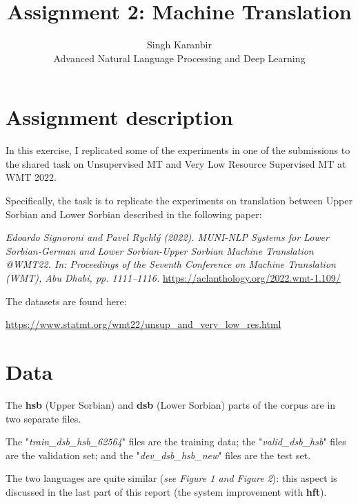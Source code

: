 \documentclass[12pt]{article}
\begin{document}
 
 
\title{Assignment 2: Machine Translation}
\author{Singh Karanbir\\ %
Advanced Natural Language Processing and Deep Learning}

\maketitle

\section{Assignment description}
In this exercise, I replicated some of the experiments in one of the submissions to the shared task on Unsupervised MT and Very Low Resource Supervised MT at WMT 2022.

Specifically, the task is to replicate the experiments on translation between Upper Sorbian and Lower Sorbian described in the following paper:

\vspace{0.5cm}
\textit{Edoardo Signoroni and Pavel Rychlý (2022). MUNI-NLP Systems for Lower Sorbian-German and Lower Sorbian-Upper Sorbian Machine Translation @WMT22. In: Proceedings of the Seventh Conference on Machine Translation (WMT), Abu Dhabi, pp. 1111–1116.}
\href{https://aclanthology.org/2022.wmt-1.109/}{https://aclanthology.org/2022.wmt-1.109/}
\vspace{0.5cm}

The datasets are found here:

\href{https://www.statmt.org/wmt22/unsup_and_very_low_res.html}{https://www.statmt.org/wmt22/unsup\_and\_very\_low\_res.html}

\section{Data}
The \textbf{hsb} (Upper Sorbian) and \textbf{dsb} (Lower Sorbian) parts of the corpus are in two separate files. 

The "\textit{train\_dsb\_hsb\_62564}" files are the training data; 
the "\textit{valid\_dsb\_hsb}" files are the validation set; and the "\textit{dev\_dsb\_hsb\_new}" files are the test set.

The two languages are quite similar (\textit{see Figure 1 and Figure 2}): this aspect is discussed in the last part of this report (the system improvement with \textbf{hft}).
\end{document}
